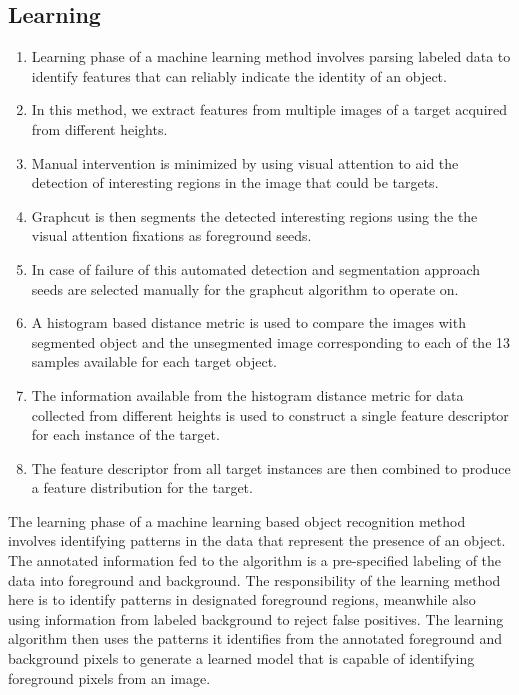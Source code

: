 \documentclass {udthesis}
\begin{document}
\subsection{Learning}

\begin{enumerate}
	\item Learning phase of a machine learning method involves parsing labeled data to identify features that can reliably indicate the identity of an object.
	
	\item In this method, we extract features from multiple images of a target acquired from different heights.
	
	\item Manual intervention is minimized by using visual attention to aid the detection of interesting regions in the image that could be targets.
	
	\item Graphcut is then segments the detected interesting regions using the the visual attention fixations as foreground seeds.
	
	\item In case of failure of this automated detection and segmentation approach seeds are selected manually for the graphcut algorithm to operate on.
	
	\item A histogram based distance metric is used to compare the images with segmented object and the unsegmented image corresponding to each of the 13 samples available for each target object.
	
	\item The information available from the histogram distance metric for data collected from different heights is used to construct a single feature descriptor for each instance of the target.
	
	\item The feature descriptor from all target instances are then combined to produce a feature distribution for the target.
\end{enumerate}


The learning phase of a machine learning based object recognition method involves identifying patterns in the data that represent the presence of an object. The annotated information fed to the algorithm is a pre-specified labeling of the data into foreground and background. The responsibility of the learning method here is to identify patterns in designated foreground regions, meanwhile also using information from labeled background to reject false positives. The learning algorithm then uses the patterns it identifies from the annotated foreground and background pixels to generate a learned model that is capable of identifying foreground pixels from an image.
\end{document}
